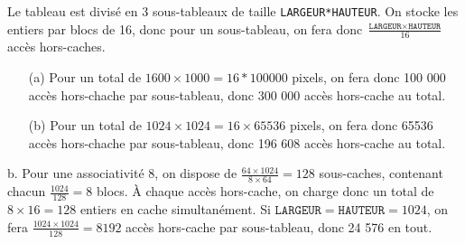 \documentclass[11pt, a4 paper]{article}
\begin{document}
Le tableau est divisé en 3 sous-tableaux de taille \texttt{LARGEUR*HAUTEUR}. On stocke les entiers par blocs de 16, donc pour un sous-tableau, on fera donc $\frac{\texttt{LARGEUR} \times \texttt{HAUTEUR}}{16}$ accès hors-caches.\\

\begin{itemize}
    \item[(a)] Pour un total de $1600\times 1000 = 16 * 100000$ pixels, on fera donc 100 000 accès hors-chache par sous-tableau, donc 300 000 accès hors-cache au total.\\
    \item[(b)] Pour un total de $1024\times 1024 = 16 \times 65536$ pixels, on fera donc 65536 accès hors-chache par sous-tableau, donc 196 608 accès hors-cache au total.\\
\end{itemize}

b. Pour une associativité 8, on dispose de $\frac{64\times 1024}{8 \times 64} = 128$ sous-caches, contenant chacun $\frac{1024}{128} = 8$ blocs.
À chaque accès hors-cache, on charge donc un total de $8 \times 16 = 128$ entiers en cache simultanément.
Si $\texttt{LARGEUR} = \texttt{HAUTEUR} = 1024$, on fera $\frac{1024\times 1024}{128} = 8192$ accès hors-cache par sous-tableau, donc 24 576 en tout.\\
\end{document}
